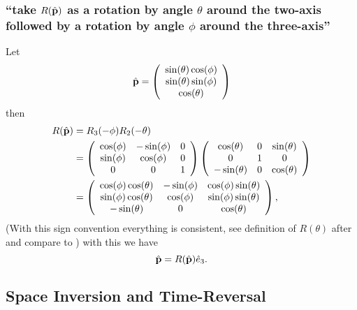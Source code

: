 \subsubsection{\enquote{take $R(\hat{\mathbf{p}})$ as a rotation by angle $\theta$ around the two-axis followed by a rotation by angle $\phi$ around the three-axis} }\label{sususec:2_5_p73_1}
Let \[\hat{\mathbf{p}}=\left(\begin{array}{c}
	\sin(\theta)\cos(\phi)\\
	\sin(\theta)\sin(\phi)\\
	\cos(\theta)
\end{array}\right)\]
then
\begin{align*} 
	R(\hat{\mathbf{p}})&=R_3(-\phi)R_2(-\theta)\\
	&=
	\left(\begin{array}{ccc}
	\cos(\phi)	& -\sin(\phi) & 0 \\
	\sin(\phi)	& \cos(\phi) & 0 \\
	0	& 0 & 1
	\end{array}\right)
	\left(\begin{array}{ccc}
	\cos(\theta) & 0 &  \sin(\theta)\\
	0	& 1 &  0\\
	-\sin(\theta)& 0 & \cos(\theta)
	\end{array}\right)\\
	&=
	\left(\begin{array}{ccc}
		\cos(\phi)\cos(\theta)	& -\sin(\phi) & \cos(\phi)\sin(\theta) \\
		\sin(\phi)\cos(\theta)	& \cos(\phi) & 	\sin(\phi)\sin(\theta) \\
		-\sin(\theta)	& 0 & \cos(\theta)
	\end{array}\right),
\end{align*}
(With this sign convention everything is consistent, see definition of $R(\theta)$ after  and compare  to )
with this we have \[\hat{\mathbf{p}}=R(\hat{\mathbf{p}}) \hat{e}_3. \]


\subsection{Space Inversion and Time-Reversal}\label{susec:2_6}

